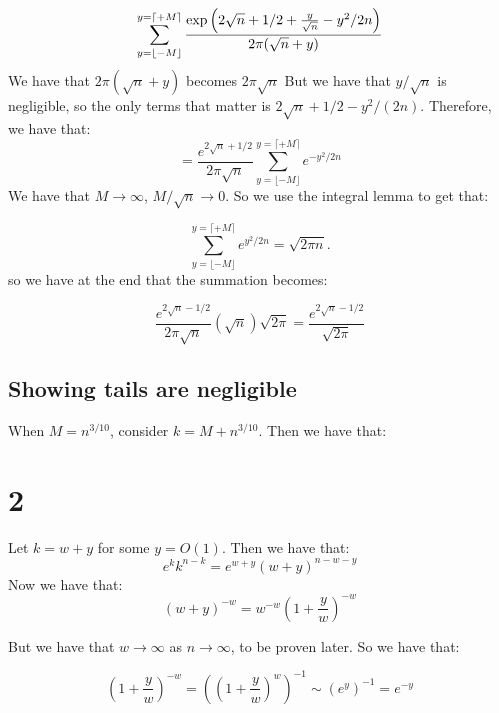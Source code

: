 \documentclass[]{article}
\begin{document}
\begin{equation}
	\sum_{y = \lfloor -M \rfloor }^{y =  \lceil + M \rceil}
	\frac{\exp\left(2 \sqrt{n} + 1/2 + \frac{y}{\sqrt{n}} - y^2/2n\right)}
	{2 \pi(\sqrt{n} + y) }\\
\end{equation}
We have that $2 \pi (\sqrt{n} + y)$ becomes $2 \pi \sqrt{n}$ 
But we have that $y/\sqrt{n}$ is negligible, so the only terms that matter is $2 \sqrt{n} + 1/2 - y^2/(2n)$. Therefore, we have that:
\begin{equation}
	=
	\frac{e^{2 \sqrt{n} + 1/2}}{2 \pi \sqrt{n}}
	\sum_{y = \lfloor -M \rfloor }^{y =  \lceil + M \rceil}
	e^{-y^2/2n}
\end{equation}
We have that $M \rightarrow \infty$, $M / \sqrt{n} \rightarrow 0$. So we use the integral lemma to get that:

\begin{equation}
	\sum_{y = \lfloor -M \rfloor }^{y =  \lceil + M \rceil}
	e^{ y^2/2n} = \sqrt{2 \pi n}.
\end{equation}
so we have at the end that the summation becomes:

\begin{equation}
	\frac{e^{2\sqrt{n} - 1/2}}{2 \pi \sqrt{n}} (\sqrt{n}) \sqrt{2 \pi} = 
	\frac{e^{2 \sqrt{n} - 1/2}}{\sqrt{2 \pi}}
\end{equation}


\subsection{Showing tails are negligible}

When $M  = n^{3/10}$, consider $k = M + n^{3/10}$. Then we have that:

\section{2}
Let $k = w + y$ for some $y = O(1)$. Then we have that:
\begin{equation}
	e^{k} k^{n - k} = e^{w + y} (w + y)^{n - w - y}
\end{equation}
Now we have that:
\begin{equation}
	(w + y)^{-w} = w^{-w} \left(1 + \frac{y}{w}\right)^{-w}
\end{equation}

But we have that $w \rightarrow \infty$ as $n \rightarrow \infty$, to be proven later. So we have that: 

\begin{equation}
	\left(1 + \frac{y}{w}\right)^{-w} = \left(\left(1 + \frac{y}{w}\right)^{w}\right)^{-1} \sim \left(e^{y}\right)^{-1} = e^{-y}
\end{equation}
\end{document}
